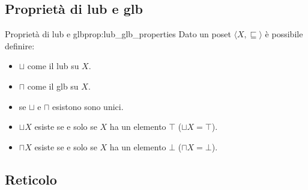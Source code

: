 \subsection{Proprietà di lub e glb}
\begin{proposizione}{Proprietà di lub e glb}{prop:lub_glb_properties}
Dato un poset $\langle X, \sqsubseteq \rangle$ è possibile definire:
\begin{itemize}
    \item $\sqcup $ come il lub su $X$.
    \item $\sqcap $ come il glb su $X$.
    \item se $\sqcup $ e $\sqcap $ esistono sono unici.
    \item $\sqcup X$ esiste se e solo se $X$ ha un elemento $\top$ ($\sqcup X = \top$).
    \item $\sqcap X$ esiste se e solo se $X$ ha un elemento $\bot$ ($\sqcap X = \bot$).
\end{itemize}
\end{proposizione}
\subsection{Reticolo}

